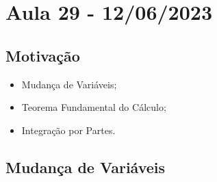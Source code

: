 \documentclass[analysis_notes.tex]{subfiles}
\begin{document}
\section{Aula 29 - 12/06/2023}
\subsection{Motivação}
\begin{itemize}
	\item Mudança de Variáveis;
	\item Teorema Fundamental do Cálculo;
	\item Integração por Partes.
\end{itemize}
\subsection{Mudança de Variáveis}
\end{document}
